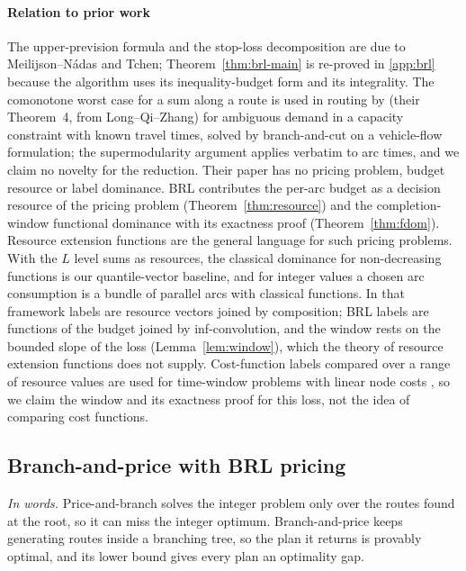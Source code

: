 \documentclass[preprint,12pt]{elsarticle}
\theoremstyle{definition}
\theoremstyle{remark}
\begin{document}
\paragraph{Relation to prior work} The upper-prevision formula and the stop-loss decomposition are due to Meilijson--N\'adas and Tchen; Theorem~\ref{thm:brl-main} is re-proved in \ref{app:brl} because the algorithm uses its inequality-budget form and its integrality. The comonotone worst case for a sum along a route is used in routing by \citet{GhosalHoWiesemann2024} (their Theorem~4, from Long--Qi--Zhang) for ambiguous demand in a capacity constraint with known travel times, solved by branch-and-cut on a vehicle-flow formulation; the supermodularity argument applies verbatim to arc times, and we claim no novelty for the reduction. Their paper has no pricing problem, budget resource or label dominance. BRL contributes the per-arc budget as a decision resource of the pricing problem (Theorem~\ref{thm:resource}) and the completion-window functional dominance with its exactness proof (Theorem~\ref{thm:fdom}). Resource extension functions \citep{Irnich2008} are the general language for such pricing problems. With the $L$ level sums as resources, the classical dominance for non-decreasing functions is our quantile-vector baseline, and for integer values a chosen arc consumption is a bundle of parallel arcs with classical functions. In that framework labels are resource vectors joined by composition; BRL labels are functions of the budget joined by inf-convolution, and the window rests on the bounded slope of the loss (Lemma~\ref{lem:window}), which the theory of resource extension functions does not supply. Cost-function labels compared over a range of resource values are used for time-window problems with linear node costs \citep{Ioachim1998}, so we claim the window and its exactness proof for this loss, not the idea of comparing cost functions.

\subsection{Branch-and-price with BRL pricing}\label{sec:bp}

\emph{In words.} Price-and-branch solves the integer problem only over the routes found at the root, so it can miss the integer optimum. Branch-and-price keeps generating routes inside a branching tree, so the plan it returns is provably optimal, and its lower bound gives every plan an optimality gap.
\end{document}
